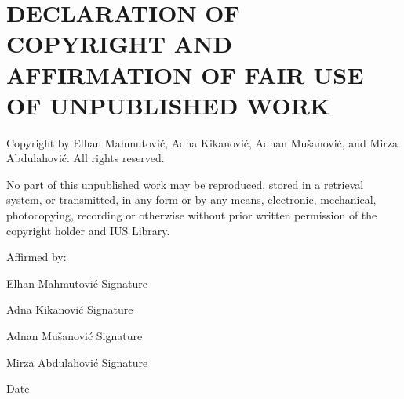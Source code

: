 \chapter*{DECLARATION OF COPYRIGHT AND AFFIRMATION OF FAIR USE OF UNPUBLISHED WORK}

\noindent Copyright \textcopyright{} \the\year{} by Elhan Mahmutovi\'{c}, Adna Kikanovi\'{c}, Adnan Mu\v{s}anovi\'{c}, and Mirza Abdulahovi\'{c}. All rights reserved.

\vspace{1em}
\noindent\textbf{\ProjectTitle}

\vspace{1em}
\noindent No part of this unpublished work may be reproduced, stored in a retrieval system, or transmitted, in any form or by any means, electronic, mechanical, photocopying, recording or otherwise without prior written permission of the copyright holder and IUS Library.

\vspace{1.5em}
\noindent Affirmed by:

\vspace{1em}

\newcommand{\SigRowC}[1]{%
  \noindent #1 \hfill Signature \makebox[6cm][l]{\dotfill}\par
  \vspace{1.2cm}%
}

\SigRowC{Elhan Mahmutovi\'{c}}
\SigRowC{Adna Kikanovi\'{c}}
\SigRowC{Adnan Mu\v{s}anovi\'{c}}
\SigRowC{Mirza Abdulahovi\'{c}}

\vspace{0.5cm}
\hfill Date \makebox[4cm][l]{\dotfill}

\clearpage
